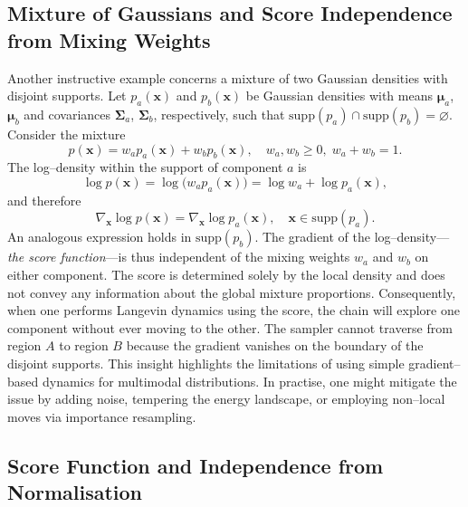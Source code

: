 \subsection{Mixture of Gaussians and Score Independence from Mixing Weights}

Another instructive example concerns a mixture of two Gaussian densities
with disjoint supports.  Let $p_a(\mathbf{x})$ and $p_b(\mathbf{x})$ be
Gaussian densities with means $\boldsymbol{\mu}_a$, $\boldsymbol{\mu}_b$ and
covariances $\boldsymbol{\Sigma}_a$, $\boldsymbol{\Sigma}_b$, respectively,
such that $\text{supp}(p_a) \cap \text{supp}(p_b)=\varnothing$.  Consider the
mixture
\begin{equation}
    p(\mathbf{x}) = w_a p_a(\mathbf{x}) + w_b p_b(\mathbf{x}),
    \quad w_a, w_b \geq 0,\; w_a + w_b = 1.
\end{equation}
The log–density within the support of component $a$ is
\begin{equation}
    \log p(\mathbf{x}) = \log\big(w_a p_a(\mathbf{x})\big)
    = \log w_a + \log p_a(\mathbf{x}),
\end{equation}
and therefore
\begin{equation}
    \nabla_{\mathbf{x}} \log p(\mathbf{x}) = \nabla_{\mathbf{x}} \log p_a(\mathbf{x}),
    \quad \mathbf{x}\in\text{supp}(p_a).
\end{equation}
An analogous expression holds in $\text{supp}(p_b)$.  The gradient of the
log–density—\emph{the score function}—is thus independent of the mixing
weights $w_a$ and $w_b$ on either component.  The score is determined
solely by the local density and does not convey any information about the
global mixture proportions.  Consequently, when one performs Langevin
dynamics using the score, the chain will explore one component without
ever moving to the other.  The sampler cannot traverse from region $A$ to
region $B$ because the gradient vanishes on the boundary of the disjoint
supports.  This insight highlights the limitations of using simple gradient–
based dynamics for multimodal distributions.  In practise, one might
mitigate the issue by adding noise, tempering the energy landscape, or
employing non–local moves via importance resampling.

\subsection{Score Function and Independence from Normalisation}

